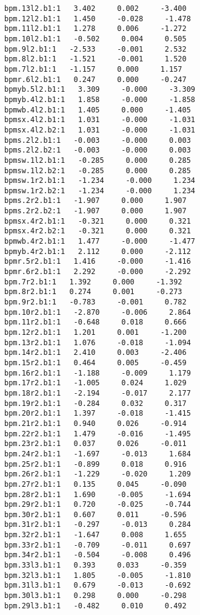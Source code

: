 \begin{verbatim}
bpm.13l2.b1:1   3.402     0.002     -3.400
bpm.12l2.b1:1   1.450     -0.028     -1.478
bpm.11l2.b1:1   1.278     0.006     -1.272
bpm.10l2.b1:1   -0.502     0.004     0.505
bpm.9l2.b1:1   -2.533     -0.001     2.532
bpm.8l2.b1:1   -1.521     -0.001     1.520
bpm.7l2.b1:1   -1.157     0.000     1.157
bpmr.6l2.b1:1   0.247     0.000     -0.247
bpmyb.5l2.b1:1   3.309     -0.000     -3.309
bpmyb.4l2.b1:1   1.858     -0.000     -1.858
bpmwb.4l2.b1:1   1.405     0.000     -1.405
bpmsx.4l2.b1:1   1.031     -0.000     -1.031
bpmsx.4l2.b2:1   1.031     -0.000     -1.031
bpms.2l2.b1:1   -0.003     -0.000     0.003
bpms.2l2.b2:1   -0.003     -0.000     0.003
bpmsw.1l2.b1:1   -0.285     0.000     0.285
bpmsw.1l2.b2:1   -0.285     0.000     0.285
bpmsw.1r2.b1:1   -1.234     -0.000     1.234
bpmsw.1r2.b2:1   -1.234     -0.000     1.234
bpms.2r2.b1:1   -1.907     0.000     1.907
bpms.2r2.b2:1   -1.907     0.000     1.907
bpmsx.4r2.b1:1   -0.321     0.000     0.321
bpmsx.4r2.b2:1   -0.321     0.000     0.321
bpmwb.4r2.b1:1   1.477     -0.000     -1.477
bpmyb.4r2.b1:1   2.112     0.000     -2.112
bpmr.5r2.b1:1   1.416     -0.000     -1.416
bpmr.6r2.b1:1   2.292     -0.000     -2.292
bpm.7r2.b1:1   1.392     0.000     -1.392
bpm.8r2.b1:1   0.274     0.001     -0.273
bpm.9r2.b1:1   -0.783     -0.001     0.782
bpm.10r2.b1:1   -2.870     -0.006     2.864
bpm.11r2.b1:1   -0.648     0.018     0.666
bpm.12r2.b1:1   1.201     0.001     -1.200
bpm.13r2.b1:1   1.076     -0.018     -1.094
bpm.14r2.b1:1   2.410     0.003     -2.406
bpm.15r2.b1:1   0.464     0.005     -0.459
bpm.16r2.b1:1   -1.188     -0.009     1.179
bpm.17r2.b1:1   -1.005     0.024     1.029
bpm.18r2.b1:1   -2.194     -0.017     2.177
bpm.19r2.b1:1   -0.284     0.032     0.317
bpm.20r2.b1:1   1.397     -0.018     -1.415
bpm.21r2.b1:1   0.940     0.026     -0.914
bpm.22r2.b1:1   1.479     -0.016     -1.495
bpm.23r2.b1:1   0.037     0.026     -0.011
bpm.24r2.b1:1   -1.697     -0.013     1.684
bpm.25r2.b1:1   -0.899     0.018     0.916
bpm.26r2.b1:1   -1.229     -0.020     1.209
bpm.27r2.b1:1   0.135     0.045     -0.090
bpm.28r2.b1:1   1.690     -0.005     -1.694
bpm.29r2.b1:1   0.720     -0.025     -0.744
bpm.30r2.b1:1   0.607     0.011     -0.596
bpm.31r2.b1:1   -0.297     -0.013     0.284
bpm.32r2.b1:1   -1.647     0.008     1.655
bpm.33r2.b1:1   -0.709     -0.011     0.697
bpm.34r2.b1:1   -0.504     -0.008     0.496
bpm.33l3.b1:1   0.393     0.033     -0.359
bpm.32l3.b1:1   1.805     -0.005     -1.810
bpm.31l3.b1:1   0.679     -0.013     -0.692
bpm.30l3.b1:1   0.298     0.000     -0.298
bpm.29l3.b1:1   -0.482     0.010     0.492

\end{verbatim}
